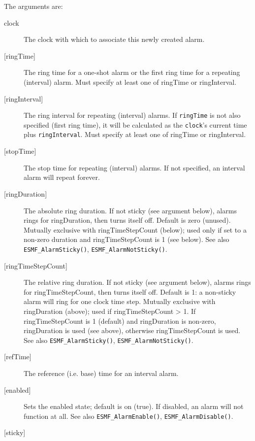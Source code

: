        The arguments are:
       \begin{description}
       \item[clock]
            The clock with which to associate this newly created alarm.
       \item[{[ringTime]}]
            The ring time for a one-shot alarm or the first ring time for a
            repeating (interval) alarm.  Must specify at least one of ringTime
            or ringInterval.
       \item[{[ringInterval]}]
            The ring interval for repeating (interval) alarms.  If
            {\tt ringTime} is not also specified (first ring time), it will be
            calculated as the {\tt clock}'s current time plus {\tt ringInterval}.
            Must specify at least one of ringTime or ringInterval.
       \item[{[stopTime]}]
            The stop time for repeating (interval) alarms.  If not
            specified, an interval alarm will repeat forever.
       \item[{[ringDuration]}]
            The absolute ring duration.  If not sticky (see argument below),
            alarms rings for ringDuration, then turns itself off.  Default is
            zero (unused).  Mutually exclusive with ringTimeStepCount (below);
            used only if set to a non-zero duration and ringTimeStepCount is 1
            (see below).
            See also {\tt ESMF\_AlarmSticky()}, {\tt ESMF\_AlarmNotSticky()}.
       \item[{[ringTimeStepCount]}]
            The relative ring duration.  If not sticky (see argument below),
            alarms rings for ringTimeStepCount, then turns itself off.
            Default is 1: a non-sticky alarm will ring for one clock time step.
            Mutually exclusive with ringDuration (above); used if
            ringTimeStepCount > 1.  If ringTimeStepCount is 1 (default) and
            ringDuration is non-zero, ringDuration is used (see above), otherwise
            ringTimeStepCount is used.
            See also {\tt ESMF\_AlarmSticky()}, {\tt ESMF\_AlarmNotSticky()}.
       \item[{[refTime]}]
            The reference (i.e. base) time for an interval alarm.
       \item[{[enabled]}]
            Sets the enabled state; default is on (true).  If disabled,
            an alarm will not function at all.
            See also {\tt ESMF\_AlarmEnable()}, {\tt ESMF\_AlarmDisable()}.
       \item[{[sticky]}]

\end{description}
